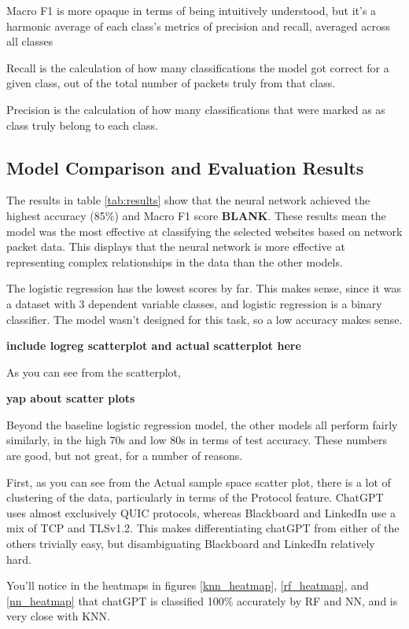 \documentclass[10pt,sigconf,letterpaper,nonacm]{acmart}
\begin{document}
Macro F1 is more opaque in terms of being intuitively understood, but it's a harmonic average of each class's metrics of precision and recall, averaged across all classes

Recall is the calculation of how many classifications the model got correct for a given class, out of the total number of packets truly from that class.

Precision is the calculation of how many classifications that were marked as as class truly belong to each class.

\subsection{Model Comparison and Evaluation Results}
The results in table \ref{tab:results} show that the neural network achieved the highest accuracy (85\%) and Macro F1 score {\bf BLANK}. These results mean the model was the most effective at classifying the selected websites based on network packet data.
This displays that the neural network is more effective at representing complex relationships in the data than the other models. 

The logistic regression has the lowest scores by far. This makes sense, since it was a dataset with 3 dependent variable classes, and logistic regression is a binary classifier. 
The model wasn't designed for this task, so a low accuracy makes sense.

{\bf include logreg scatterplot and actual scatterplot here}

As you can see from the scatterplot, 

{\bf yap about scatter plots}

Beyond the baseline logistic regression model, the other models all perform fairly similarly, in the high 70s and low 80s in terms of test accuracy.
These numbers are good, but not great, for a number of reasons.

First, as you can see from the Actual sample space scatter plot, there is a lot of clustering of the data, particularly in terms of the Protocol feature. ChatGPT uses almost exclusively QUIC protocols, whereas Blackboard and LinkedIn use a mix of TCP and TLSv1.2. This makes differentiating chatGPT from either of the others trivially easy, but disambiguating Blackboard and LinkedIn relatively hard.

You'll notice in the heatmaps in figures \ref{knn_heatmap}, \ref{rf_heatmap}, and \ref{nn_heatmap} that chatGPT is classified 100\% accurately by RF and NN, and is very close with KNN. 
\end{document}
